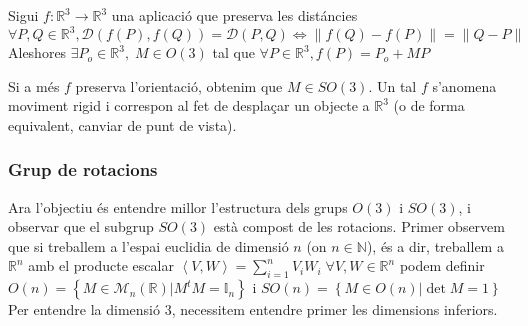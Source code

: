 \documentclass[../main.tex]{subfiles}
\begin{document}
\begin{teorema}
    Sigui $f: \mathbb{R}^3 \to \mathbb{R}^3$ una aplicació que preserva les distáncies $\forall P, Q \in \mathbb{R}^3, \mathcal{D}\left(f(P), f(Q)\right) = \mathcal{D}(P, Q) \Leftrightarrow \left\lVert f(Q)-f(P)\right\rVert = \left\lVert Q-P\right\rVert$
    Aleshores $\exists P_o \in \mathbb{R}^3,\; M \in O(3)$ tal que $\forall P \in \mathbb{R}^3, f(P) = P_o + MP$
\end{teorema}
\begin{definicio}
    Si a més $f$ preserva l'orientació, obtenim que $M \in SO(3)$.
    Un tal $f$ s'anomena moviment rigid i correspon al fet de desplaçar un objecte a $\mathbb{R}^3$
    (o de forma equivalent, canviar de punt de vista).
\end{definicio}
\subsubsection{Grup de rotacions}
Ara l'objectiu és entendre millor l'estructura dels grups $O(3)$ i $SO(3)$, i observar que el
subgrup $SO(3)$ està compost de les rotacions.
Primer observem que si treballem a l'espai euclidia de dimensió $n$ (on $n \in \mathbb{N}$), és a
dir, treballem a $\mathbb{R}^n$ amb el producte escalar $\left\langle V, W\right\rangle = \sum\limits_{i = 1}^{n} V_i W_i\; \forall V, W \in \mathbb{R}^n$
podem definir $O(n) = \left\{M \in \mathcal{M}_n(\mathbb{R}) | M^tM = \mathbb{I}_n\right\}$ i $SO(n) = \left\{M \in O(n) | \det{M} = 1\right\}$\\
Per entendre la dimensió $3$, necessitem entendre primer les dimensions inferiors.
\end{document}
